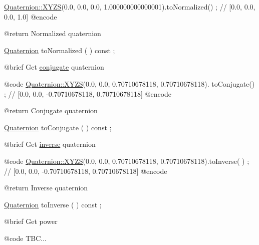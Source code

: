 \begin{DoxyCode}
                        \hyperlink{classlibrary_1_1math_1_1geom_1_1d3_1_1trf_1_1rot_1_1_quaternion_a006294eb483bcfc352c2dc36cf19ceec}{Quaternion::XYZS}(0.0, 0.0, 0.0, 1.000000000000001).toNormalized() ;
       \textcolor{comment}{// [0.0, 0.0, 0.0, 1.0]}
    @encode
   
    @\textcolor{keywordflow}{return}             Normalized quaternion

\hyperlink{classlibrary_1_1math_1_1geom_1_1d3_1_1trf_1_1rot_1_1_quaternion_a1b8794cce68c5ee86dd50f9ba53635fa}{Quaternion}              toNormalized                                ( ) \textcolor{keyword}{const} ;

    @brief              Get \hyperlink{classlibrary_1_1math_1_1geom_1_1d3_1_1trf_1_1rot_1_1_quaternion_a2c27f0a46d1f156b8d05e0e9746b33f9}{conjugate} quaternion
   
    @code
                        \hyperlink{classlibrary_1_1math_1_1geom_1_1d3_1_1trf_1_1rot_1_1_quaternion_a006294eb483bcfc352c2dc36cf19ceec}{Quaternion::XYZS}(0.0, 0.0, 0.70710678118, 0.70710678118).
      toConjugate() ; \textcolor{comment}{// [0.0, 0.0, -0.70710678118, 0.70710678118]}
    @encode
   
    @\textcolor{keywordflow}{return}             Conjugate quaternion

\hyperlink{classlibrary_1_1math_1_1geom_1_1d3_1_1trf_1_1rot_1_1_quaternion_a1b8794cce68c5ee86dd50f9ba53635fa}{Quaternion}              toConjugate                                 ( ) \textcolor{keyword}{const} ;

    @brief              Get \hyperlink{classlibrary_1_1math_1_1geom_1_1d3_1_1trf_1_1rot_1_1_quaternion_a9d35d28051651be52dde4f495f23cf7a}{inverse} quaternion
   
    @code
                        \hyperlink{classlibrary_1_1math_1_1geom_1_1d3_1_1trf_1_1rot_1_1_quaternion_a006294eb483bcfc352c2dc36cf19ceec}{Quaternion::XYZS}(0.0, 0.0, 0.70710678118, 0.70710678118).toInverse(
      ) ; \textcolor{comment}{// [0.0, 0.0, -0.70710678118, 0.70710678118]}
    @encode
   
    @\textcolor{keywordflow}{return}             Inverse quaternion

\hyperlink{classlibrary_1_1math_1_1geom_1_1d3_1_1trf_1_1rot_1_1_quaternion_a1b8794cce68c5ee86dd50f9ba53635fa}{Quaternion}              toInverse                                   ( ) \textcolor{keyword}{const} ;

    @brief              Get power
   
    @code
                        TBC...
\end{DoxyCode}



